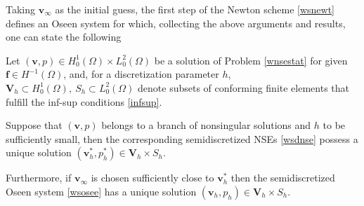\documentclass[a4paper,10pt,BCOR=15mm]{scrbook}
\begin{document}
Taking $\mathbf v_\infty$ as the initial guess, the first step of the Newton scheme \eqref{wsnewt} defines an Oseen system for which, collecting the above arguments and results, one can state the following
\begin{cor}
Let $(\mathbf v,p) \in H_0^1(\Omega) \times L^2_0 (\Omega)$ be a solution of Problem \ref{wnsestat} for given $\mathbf f \in H^{-1} (\Omega)$, and, for a discretization parameter $h$, $\mathbf V_h \subset H_0^1(\Omega), ~S_h \subset L^2_0 (\Omega)$ denote subsets of conforming finite elements that fulfill the inf-sup conditions \eqref{infsup}. 

Suppose that $(\mathbf v,p)$ belongs to a branch of nonsingular solutions and $h$ to be sufficiently small, then the corresponding semidiscretized NSEs \eqref{wsdnse} possess a unique solution $(\mathbf v_h^*, p_h^*)\in \mathbf V_h \times S_h $.

Furthermore, if $\mathbf v_\infty$ is chosen sufficiently close to $\mathbf v_h^*$ then the semidiscretized Oseen system \eqref{wsosee} has a unique solution $(\mathbf v_h, p_h)  \in \mathbf V_h\times S_h$.
\end{cor}
\end{document}
